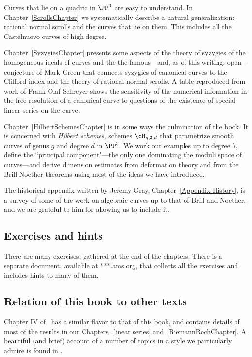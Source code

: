 Curves that lie on a quadric in $\PP^3$ are easy to understand. In Chapter~\ref{ScrollsChapter} we systematically describe a natural generalization: rational normal scrolls and the curves that lie on them. This includes all the Castelnuovo curves of high degree. 

Chapter~\ref{SyzygiesChapter} presents some aspects of the theory of syzygies of the homogeneous ideals of curves and the the famous---and, as of this writing, open---conjecture of Mark Green that connects syzygies of canonical curves to the Clifford index and the theory of rational normal scrolls. A table reproduced from work of Frank-Olaf Schreyer shows the sensitivity of the numerical information in the free resolution of a canonical curve to questions of the existence of special linear series on the curve.

Chapter~\ref{HilbertSchemesChapter} is in some ways the culmination of the book. It is concerned with \emph{Hilbert schemes}, schemes $\cH_{g,3,d}$ that parametrize smooth curves of genus $g$ and degree $d$  in $\PP^3$. We work out examples up to degree 7, define the ``principal component"---the only one dominating the moduli space of curves---and derive dimension estimates from deformation theory and from the Brill-Noether theorems
using most of the ideas we have introduced. 

The historical appendix written by Jeremy Gray, Chapter~\ref{Appendix-History},  is a survey of some of the work on
algebraic curves up to that of Brill and Noether, and we are grateful to him for allowing us to include it.

\subsection{Exercises and hints}

There are many exercises, gathered at the end of the chapters. There is a separate document, available at ***.ams.org, that
collects all the exercises and includes hints to many of them.

\subsection{Relation of this book to other texts} 
Chapter IV of~\cite{Hartshorne1977} has a similar flavor to that of this book, and contains details of most of the 
results in our Chapters~\ref{linear series} and~\ref{RiemannRochChapter}. A beautiful (and brief) account of a number of topics in a style we particularly admire is found in \cite{MumfordCJ}.

